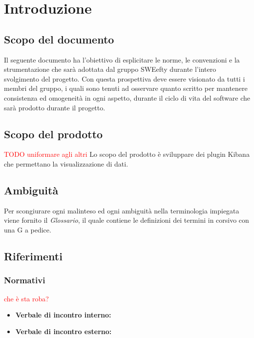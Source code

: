 \section{Introduzione}
\subsection{Scopo del documento}
Il seguente documento ha l'obiettivo di esplicitare le norme, le convenzioni e la strumentazione che sarà adottata dal gruppo SWEefty durante l'intero svolgimento del progetto. Con questa prospettiva deve essere visionato da tutti i membri del gruppo, i quali sono tenuti ad osservare quanto scritto per mantenere consistenza ed omogeneità in ogni aspetto, durante il ciclo di vita del software che sarà prodotto durante il progetto.
\subsection{Scopo del prodotto}
\textcolor{red}{TODO uniformare agli altri}
Lo scopo del prodotto è sviluppare dei plugin Kibana che permettano la visualizzazione di dati.

\subsection{Ambiguità}
Per scongiurare ogni malinteso ed ogni ambiguità nella terminologia impiegata viene fornito il \textit{Glossario}, il quale contiene le definizioni dei termini in corsivo con una G a pedice.

\subsection{Riferimenti}
	\subsubsection{Normativi}
	\textcolor{red}{che è sta roba?}
		\begin{itemize}
			\item \textbf{Verbale di incontro interno:}
			\item \textbf{Verbale di incontro esterno:}		
		\end{itemize}
